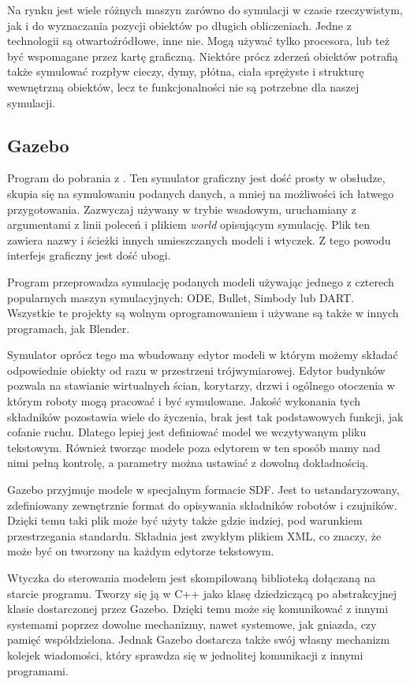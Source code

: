 	Na rynku jest wiele różnych maszyn zarówno do symulacji w czasie rzeczywistym, jak i do wyznaczania pozycji obiektów po długich obliczeniach.
	Jedne z technologii są otwartoźródłowe, inne nie. Mogą używać tylko procesora, lub też być wspomagane przez kartę graficzną.
	Niektóre prócz zderzeń obiektów potrafią także symulować rozpływ cieczy, dymy, płótna, ciała sprężyste i strukturę wewnętrzną obiektów, lecz te funkcjonalności nie są potrzebne dla naszej symulacji.

	\subsection{Gazebo}
	Program do pobrania z \cite{gazebo_website}. Ten symulator graficzny jest dość prosty w obsłudze, skupia się na symulowaniu podanych danych, a mniej na możliwości ich łatwego przygotowania.
	Zazwyczaj używany w trybie wsadowym, uruchamiany z argumentami z linii poleceń i plikiem \emph{world} opisującym symulację.
	Plik ten zawiera nazwy i ścieżki innych umieszczanych modeli i wtyczek.
	Z tego powodu interfejs graficzny jest dość ubogi.

	Program przeprowadza symulację podanych modeli używając jednego z czterech popularnych maszyn symulacyjnych: ODE, Bullet, Simbody lub DART.
	Wszystkie te projekty są wolnym oprogramowaniem i używane są także w innych programach, jak Blender.

	Symulator oprócz tego ma wbudowany edytor modeli w którym możemy składać odpowiednie obiekty od razu w przestrzeni trójwymiarowej.
	Edytor budynków pozwala na stawianie wirtualnych ścian, korytarzy, drzwi i ogólnego otoczenia w którym roboty mogą pracować i być symulowane.
	Jakość wykonania tych składników pozostawia wiele do życzenia, brak jest tak podstawowych funkcji, jak cofanie ruchu.
	Dlatego lepiej jest definiować model we wczytywanym pliku tekstowym.
	Również tworząc modele poza edytorem w ten sposób mamy nad nimi pełną kontrolę, a parametry można ustawiać z dowolną dokładnością.

	Gazebo przyjmuje modele w specjalnym formacie SDF. Jest to ustandaryzowany, zdefiniowany zewnętrznie format do opisywania składników robotów i czujników.
	Dzięki temu taki plik może być użyty także gdzie indziej, pod warunkiem przestrzegania standardu.
	Składnia jest zwykłym plikiem XML, co znaczy, że może być on tworzony na każdym edytorze tekstowym.

	Wtyczka do sterowania modelem jest skompilowaną biblioteką dołączaną na starcie programu.
	Tworzy się ją w C++ jako klasę dziedziczącą po abstrakcyjnej klasie dostarczonej przez Gazebo.
	Dzięki temu może się komunikować z innymi systemami poprzez dowolne mechanizmy, nawet systemowe, jak gniazda, czy pamięć współdzielona.
	Jednak Gazebo dostarcza także swój własny mechanizm kolejek wiadomości, który sprawdza się w jednolitej komunikacji z innymi programami.

